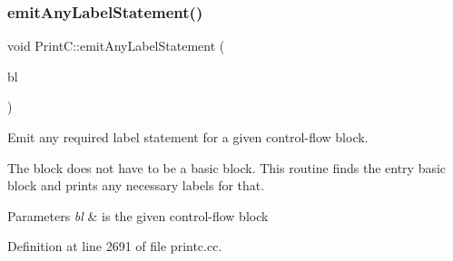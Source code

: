 \subsubsection{\texorpdfstring{emitAnyLabelStatement()}{emitAnyLabelStatement()}}
{\footnotesize\ttfamily void Print\+C\+::emit\+Any\+Label\+Statement (\begin{DoxyParamCaption}\item[{const \mbox{\hyperlink{class_flow_block}{Flow\+Block}} $\ast$}]{bl }\end{DoxyParamCaption})\hspace{0.3cm}{\ttfamily [protected]}}



Emit any required label statement for a given control-\/flow block. 

The block does not have to be a basic block. This routine finds the entry basic block and prints any necessary labels for that. 
\begin{DoxyParams}{Parameters}
{\em bl} & is the given control-\/flow block \\
\hline
\end{DoxyParams}


Definition at line 2691 of file printc.\+cc.

